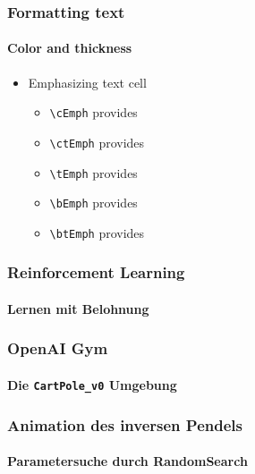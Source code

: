 \documentclass[10pt,t,aspectratio=1610]{beamer}
\begin{document}

\begin{frame}
  \frametitle{Formatting text}
  \framesubtitle{Color and thickness}

  \begin{itemize}
  \item Emphasizing text  cell
    \begin{itemize}
    \item \texttt{\textbackslash cEmph} provides 
    \item \texttt{\textbackslash ctEmph} provides 
    \item \texttt{\textbackslash tEmph} provides 
    \item \texttt{\textbackslash bEmph} provides 
    \item \texttt{\textbackslash btEmph} provides 
    \end{itemize}
  \end{itemize}  
\end{frame}


\begin{frame}
	\frametitle{Reinforcement Learning}
	\framesubtitle{Lernen mit Belohnung}


\end{frame}


\begin{frame}
	\frametitle{OpenAI Gym}
	\framesubtitle{Die \texttt{CartPole\_v0} Umgebung}


\end{frame}


\begin{frame}
	\frametitle{Animation des inversen Pendels}
	\framesubtitle{Parametersuche durch RandomSearch}
	


\end{frame}

\end{document}
